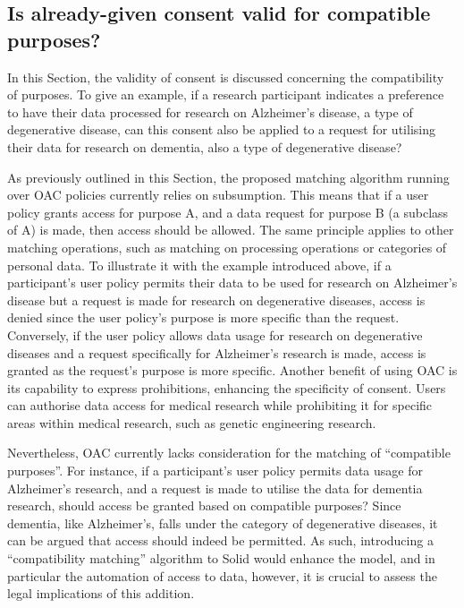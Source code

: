 \subsection{Is already-given consent valid for compatible purposes?}
\label{sec:consent_compatibility}

In this Section, the validity of consent is discussed concerning the compatibility of purposes.
To give an example, if a research participant indicates a preference to have their data processed for research on Alzheimer's disease, a type of degenerative disease, can this consent also be applied to a request for utilising their data for research on dementia, also a type of degenerative disease?

As previously outlined in this Section, the proposed matching algorithm running over OAC policies currently relies on subsumption.
This means that if a user policy grants access for purpose A, and a data request for purpose B (a subclass of A) is made, then access should be allowed.
The same principle applies to other matching operations, such as matching on processing operations or categories of personal data.
To illustrate it with the example introduced above, if a participant's user policy permits their data to be used for research on Alzheimer's disease but a request is made for research on degenerative diseases, access is denied since the user policy's purpose is more specific than the request. Conversely, if the user policy allows data usage for research on degenerative diseases and a request specifically for Alzheimer's research is made, access is granted as the request's purpose is more specific.
Another benefit of using OAC is its capability to express prohibitions, enhancing the specificity of consent.
Users can authorise data access for medical research while prohibiting it for specific areas within medical research, such as genetic engineering research.

Nevertheless, OAC currently lacks consideration for the matching of ``compatible purposes''.
For instance, if a participant's user policy permits data usage for Alzheimer's research, and a request is made to utilise the data for dementia research, should access be granted based on compatible purposes?
Since dementia, like Alzheimer's, falls under the category of degenerative diseases, it can be argued that access should indeed be permitted.
As such, introducing a ``compatibility matching'' algorithm to Solid would enhance the model, and in particular the automation of access to data, however, it is crucial to assess the legal implications of this addition.

